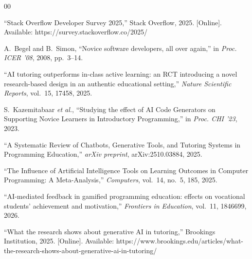 \documentclass[conference,a4paper]{IEEEtran}
\begin{document}
\begin{thebibliography}{00}

 ``Stack Overflow Developer Survey 2025,'' Stack Overflow, 2025. [Online]. Available: https://survey.stackoverflow.co/2025/

 A.~Begel and B.~Simon, ``Novice software developers, all over again,'' in \textit{Proc. ICER '08}, 2008, pp.~3--14.

 ``AI tutoring outperforms in-class active learning: an RCT introducing a novel research-based design in an authentic educational setting,'' \textit{Nature Scientific Reports}, vol.~15, 17458, 2025.

 S.~Kazemitabaar \textit{et al.}, ``Studying the effect of AI Code Generators on Supporting Novice Learners in Introductory Programming,'' in \textit{Proc. CHI '23}, 2023.

 ``A Systematic Review of Chatbots, Generative Tools, and Tutoring Systems in Programming Education,'' \textit{arXiv preprint}, arXiv:2510.03884, 2025.

 ``The Influence of Artificial Intelligence Tools on Learning Outcomes in Computer Programming: A Meta-Analysis,'' \textit{Computers}, vol.~14, no.~5, 185, 2025.

 ``AI-mediated feedback in gamified programming education: effects on vocational students' achievement and motivation,'' \textit{Frontiers in Education}, vol.~11, 1846699, 2026.

 ``What the research shows about generative AI in tutoring,'' Brookings Institution, 2025. [Online]. Available: https://www.brookings.edu/articles/what-the-research-shows-about-generative-ai-in-tutoring/

\end{thebibliography}
\end{document}
